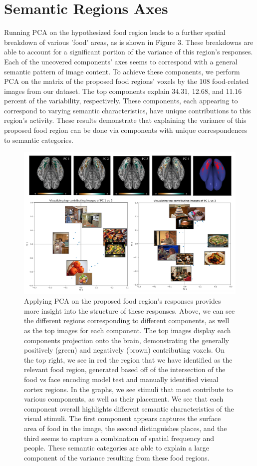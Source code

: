 \documentclass[../thesis.tex]{subfiles}
\begin{document}
\section{Semantic Regions Axes}
Running PCA on the hypothesized food region leads to a further spatial breakdown of various 'food' areas, as is shown in Figure 3. These breakdowns are able to account for a significant portion of the variance of this region's responses. Each of the uncovered components' axes seems to correspond with a general semantic pattern of image content. To achieve these components, we perform PCA on the matrix of the proposed food regions' voxels by the 108 food-related images from our dataset. The top components explain 34.31, 12.68, and 11.16 percent of the variability, respectively. These components, each appearing to correspond to varying semantic characteristics, have unique contributions to this region's activity. These results demonstrate that explaining the variance of this proposed food region can be done via components with unique correspondences to semantic categories.
    \begin{figure}
        \centering
        \includegraphics[scale=0.45]{fig3.png}
        \caption{Applying PCA on the proposed food region's responses provides more insight into the structure of these responses. Above, we can see the different regions corresponding to different components, as well as the top images for each component. The top images display each components projection onto the brain, demonstrating the generally positively (green) and negatively (brown) contributing voxels. On the top right, we see in red the region that we have identified as the relevant food region, generated based off of the intersection of the food vs face encoding model test and manually identified visual cortex regions. In the graphs, we see stimuli that most contribute to various components, as well as their placement. We see that each component overall highlights different semantic characteristics of the visual stimuli. The first component appears captures the surface area of food in the image, the second distinguishes places, and the third seems to capture a combination of spatial frequency and people. These semantic categories are able to explain a large component of the variance resulting from these food regions.} \label{fig1}
    \end{figure}
\end{document}
